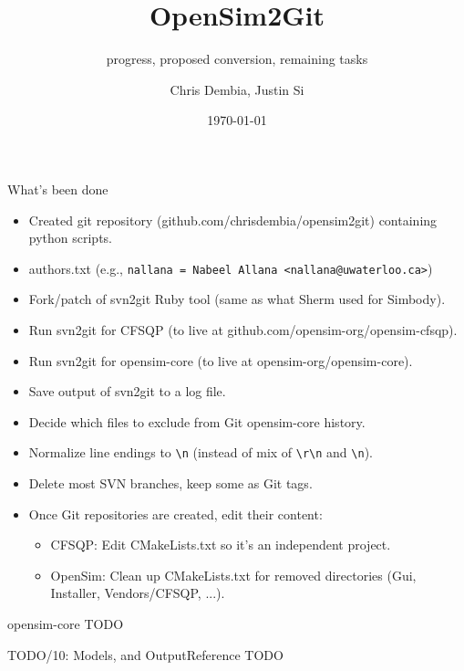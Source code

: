 \documentclass[pdf, 8pt]{beamer}
\title{OpenSim2Git}
\subtitle{progress, proposed conversion, remaining tasks}
\author{Chris Dembia, Justin Si}
\date{\today}
\def\NUMDECISIONS{10}
\begin{document}
\begin{frame}[fragile]{What's been done}

\begin{itemize}
\item Created git repository (github.com/chrisdembia/opensim2git) containing
    python scripts.
\item authors.txt (e.g., \verb|nallana = Nabeel Allana <nallana@uwaterloo.ca>|)
\item Fork/patch of svn2git Ruby tool (same as what Sherm used for Simbody).
\item Run svn2git for CFSQP (to live at github.com/opensim-org/opensim-cfsqp).
\item Run svn2git for opensim-core (to live at opensim-org/opensim-core).
\item Save output of svn2git to a log file.
\item Decide which files to exclude from Git opensim-core history.
\item Normalize line endings to \verb|\n| (instead of mix of \verb|\r\n| and
\verb|\n|).
\item Delete most SVN branches, keep some as Git tags.
\item Once Git repositories are created, edit their content:
    \begin{itemize}
    \item CFSQP: Edit CMakeLists.txt so it's an independent project.
    \item OpenSim: Clean up CMakeLists.txt for removed directories (Gui, Installer,
    Vendors/CFSQP, ...).
    \end{itemize}
\end{itemize}
\end{frame}

\begin{frame}{opensim-core}
TODO 
\end{frame}

\begin{frame}{TODO/\NUMDECISIONS: Models, and OutputReference}
TODO
\end{frame}

\end{document}

